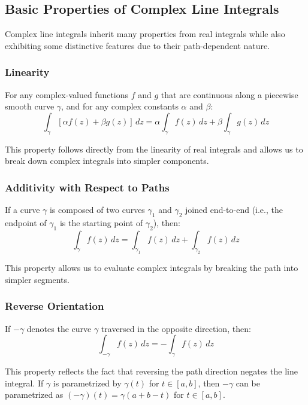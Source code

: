 \subsection*{Basic Properties of Complex Line Integrals} 

\noindent Complex line integrals inherit many properties from real integrals while also exhibiting some distinctive features due to their path-dependent nature.

\subsubsection*{Linearity}

\noindent For any complex-valued functions $f$ and $g$ that are continuous along a piecewise smooth curve $\gamma$, and for any complex constants $\alpha$ and $\beta$:
\[
\int_{\gamma} [\alpha f(z) + \beta g(z)] \, dz = \alpha \int_{\gamma} f(z) \, dz + \beta \int_{\gamma} g(z) \, dz
\]

\noindent This property follows directly from the linearity of real integrals and allows us to break down complex integrals into simpler components.

\subsubsection*{Additivity with Respect to Paths}

\noindent If a curve $\gamma$ is composed of two curves $\gamma_1$ and $\gamma_2$ joined end-to-end (i.e., the endpoint of $\gamma_1$ is the starting point of $\gamma_2$), then:
\[
\int_{\gamma} f(z) \, dz = \int_{\gamma_1} f(z) \, dz + \int_{\gamma_2} f(z) \, dz
\]

\noindent This property allows us to evaluate complex integrals by breaking the path into simpler segments.

\subsubsection*{Reverse Orientation}

\noindent If $-\gamma$ denotes the curve $\gamma$ traversed in the opposite direction, then:
\[
\int_{-\gamma} f(z) \, dz = -\int_{\gamma} f(z) \, dz
\]

\noindent This property reflects the fact that reversing the path direction negates the line integral. If $\gamma$ is parametrized by $\gamma(t)$ for $t \in [a,b]$, then $-\gamma$ can be parametrized as $(-\gamma)(t) = \gamma(a+b-t)$ for $t \in [a,b]$.

